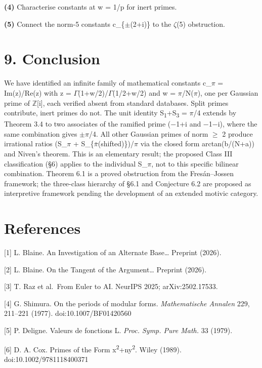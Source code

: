 \documentclass[11pt]{article}
\begin{document}
\textbf{(4)} Characterise constants at w = 1/p for inert primes.

\textbf{(5)} Connect the norm-5 constants c\_\{\(\pm\)(2+i)\} to the
\(\zeta\)(5) obstruction.

\hypertarget{conclusion}{%
\section{9. Conclusion}\label{conclusion}}

We have identified an infinite family of mathematical constants
c\_\(\pi\) = \textbar Im(z)/Re(z)\textbar{} with z =
\(\Gamma\)(1+w/2)/\(\Gamma\)(1/2+w/2) and w = \(\pi\)/N(\(\pi\)), one
per Gaussian prime of \(\mathbb{Z}\){[}i{]}, each verified absent from
standard databases. Split primes contribute, inert primes do not. The
unit identity S\textsubscript{1}+S\textsubscript{3} = \(\pi\)/4 extends
by Theorem 3.4 to two associates of the ramified prime (−1+i and −1−i),
where the same combination gives \(\pm \pi\)/4. All other Gaussian
primes of norm \(\geq\) 2 produce irrational ratios (S\_\(\pi\) +
S\_\{\(\bar{\pi}\)(shifted)\})/\(\pi\) via the closed form
arctan(b/(N+a)) and Niven's theorem. This is an elementary result; the
proposed Class III classification (§6) applies to the individual
S\_\(\pi\), not to this specific bilinear combination. Theorem 6.1 is a
proved obstruction from the Fresán--Jossen framework; the three-class
hierarchy of §6.1 and Conjecture 6.2 are proposed as interpretive
framework pending the development of an extended motivic category.

\hypertarget{references}{%
\section{References}\label{references}}

{[}1{]} L. Blaine. An Investigation of an Alternate Base\ldots{}
Preprint (2026).

{[}2{]} L. Blaine. On the Tangent of the Argument\ldots{} Preprint
(2026).

{[}3{]} T. Raz et al.~From Euler to AI. NeurIPS 2025; arXiv:2502.17533.

{[}4{]} G. Shimura. On the periods of modular forms. \emph{Mathematische
Annalen} 229, 211--221 (1977). doi:10.1007/BF01420560

{[}5{]} P. Deligne. Valeurs de fonctions L. \emph{Proc. Symp. Pure
Math.} 33 (1979).

{[}6{]} D. A. Cox. Primes of the Form
x\textsuperscript{2}+ny\textsuperscript{2}. Wiley (1989).
doi:10.1002/9781118400371
\end{document}

